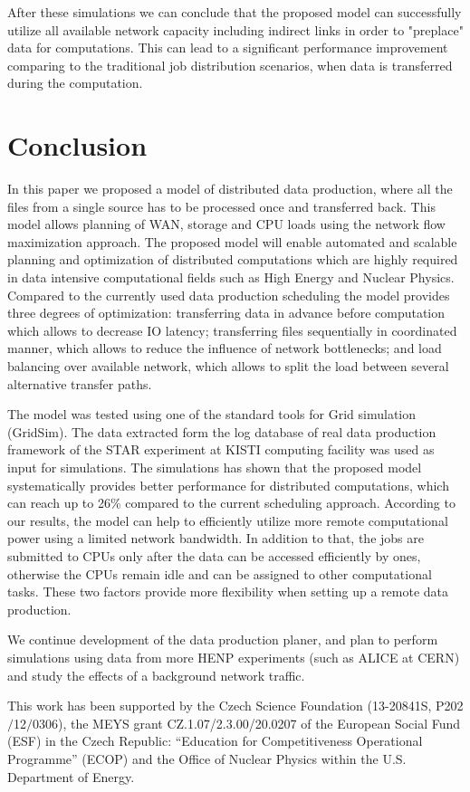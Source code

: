 \documentclass{svjour3}                     %
\begin{document}
After these simulations we can conclude that the proposed model can successfully utilize all available network capacity including indirect links in order to "preplace" data for computations. This can lead to a significant performance improvement comparing to the traditional job distribution scenarios, when data is transferred during the computation. 

\section{Conclusion}
\label{Conclusion}

In this paper we proposed a model of distributed data production, where all
the files from a single source has to be processed once and transferred back.
This model allows planning of WAN, storage and CPU loads using the network
flow maximization approach. The proposed model will enable automated and scalable planning and optimization of distributed computations which are highly required in data intensive computational fields such as High Energy and Nuclear Physics. Compared to the currently used data production scheduling the model provides three degrees of optimization: transferring data in advance before computation which allows to decrease IO latency; transferring  files sequentially in coordinated manner, which allows to reduce the influence of network bottlenecks; and load balancing over available network, which allows to split the load between several alternative transfer paths.

The model was tested using one of the standard tools for Grid simulation (GridSim). The data extracted form the log database of real data production framework of the STAR experiment at KISTI computing facility was used as input for simulations. The simulations has shown that the proposed model systematically provides better performance for distributed computations, which can reach up to 26\% compared to the current scheduling approach. According to our results, the model can help to efficiently utilize more remote computational power using a limited network bandwidth. In addition to that, the jobs are submitted to CPUs only after the data can be accessed efficiently by ones, otherwise the CPUs remain idle and can be assigned to other computational tasks. These two factors provide more flexibility when setting up a remote data production.

We continue development of the data production planer, and plan to perform simulations using data from more HENP experiments (such as ALICE at CERN) and study the effects of a background network traffic.


\begin{acknowledgements}
This work has been supported by the Czech Science Foundation
(13-20841S, P202$/$12$/$0306),  the MEYS grant CZ.1.07/2.3.00/20.0207 of the European Social Fund (ESF) in the Czech Republic: “Education for Competitiveness Operational Programme” (ECOP) and the Office of Nuclear Physics within the U.S. Department of Energy.  
\end{acknowledgements}

{}

\end{document}

